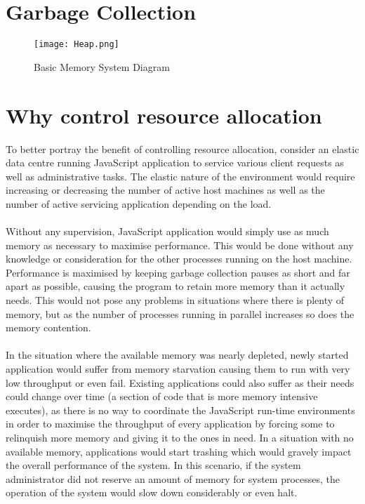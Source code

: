 \documentclass{l4proj}
\begin{document}
\section{Garbage Collection}
\begin{figure}[!ht]
  \centering
    \texttt{[image: Heap.png]}
    \caption{Basic Memory System Diagram}
\end{figure}
\section{Why control resource allocation}
\hspace*{3em} To better portray the benefit of controlling resource allocation, consider an elastic data centre running JavaScript application to service various client requests as well as administrative tasks. The elastic nature of the environment would require increasing or decreasing the number of active host machines as well as the number of active servicing application depending on the load. 
\\\\
\hspace*{3em} Without any supervision, JavaScript application would simply use as much memory as necessary to maximise performance. This would be done without any knowledge or consideration for the other processes running on the host machine. Performance is maximised by keeping garbage collection pauses as short and far apart as possible, causing the program to retain more memory than it actually needs. This would not pose any problems in situations where there is plenty of memory, but as the number of processes running in parallel increases so does the memory contention.
\\\\
\hspace*{3em} In the situation where the available memory was nearly depleted, newly started application would suffer from memory starvation causing them to run with very low throughput or even fail. Existing applications could also suffer as their needs could change over time (a section of code that is more memory intensive executes), as there is no way to coordinate the JavaScript run-time environments in order to maximise the throughput of every application by forcing some to relinquish more memory and giving it to the ones in need. In a situation with no available memory, applications would start trashing which would gravely impact the overall performance of the system. In this scenario, if the system administrator did not reserve an amount of memory for system processes, the operation of the system would slow down considerably or even halt. 
\end{document}
